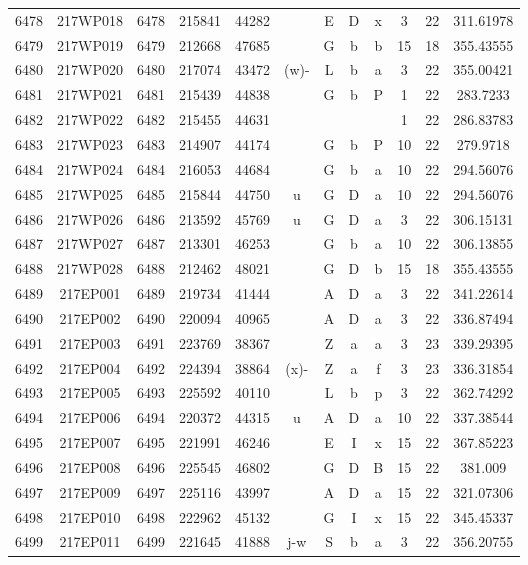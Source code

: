 \begin{tabular}{|*{12}{c|}}
6478 & 217WP018 & 6478 & 215841 & 44282 &  & E & D & x & 3 & 22 & 311.61978 \\ 
6479 & 217WP019 & 6479 & 212668 & 47685 &  & G & b & b & 15 & 18 & 355.43555 \\ 
6480 & 217WP020 & 6480 & 217074 & 43472 & (w)- & L & b & a & 3 & 22 & 355.00421 \\ 
6481 & 217WP021 & 6481 & 215439 & 44838 &  & G & b & P & 1 & 22 & 283.7233 \\ 
6482 & 217WP022 & 6482 & 215455 & 44631 &  &  &  &  & 1 & 22 & 286.83783 \\ 
6483 & 217WP023 & 6483 & 214907 & 44174 &  & G & b & P & 10 & 22 & 279.9718 \\ 
6484 & 217WP024 & 6484 & 216053 & 44684 &  & G & b & a & 10 & 22 & 294.56076 \\ 
6485 & 217WP025 & 6485 & 215844 & 44750 & u & G & D & a & 10 & 22 & 294.56076 \\ 
6486 & 217WP026 & 6486 & 213592 & 45769 & u & G & D & a & 3 & 22 & 306.15131 \\ 
6487 & 217WP027 & 6487 & 213301 & 46253 &  & G & b & a & 10 & 22 & 306.13855 \\ 
6488 & 217WP028 & 6488 & 212462 & 48021 &  & G & D & b & 15 & 18 & 355.43555 \\ 
6489 & 217EP001 & 6489 & 219734 & 41444 &  & A & D & a & 3 & 22 & 341.22614 \\ 
6490 & 217EP002 & 6490 & 220094 & 40965 &  & A & D & a & 3 & 22 & 336.87494 \\ 
6491 & 217EP003 & 6491 & 223769 & 38367 &  & Z & a & a & 3 & 23 & 339.29395 \\ 
6492 & 217EP004 & 6492 & 224394 & 38864 & (x)- & Z & a & f & 3 & 23 & 336.31854 \\ 
6493 & 217EP005 & 6493 & 225592 & 40110 &  & L & b & p & 3 & 22 & 362.74292 \\ 
6494 & 217EP006 & 6494 & 220372 & 44315 & u & A & D & a & 10 & 22 & 337.38544 \\ 
6495 & 217EP007 & 6495 & 221991 & 46246 &  & E & I & x & 15 & 22 & 367.85223 \\ 
6496 & 217EP008 & 6496 & 225545 & 46802 &  & G & D & B & 15 & 22 & 381.009 \\ 
6497 & 217EP009 & 6497 & 225116 & 43997 &  & A & D & a & 15 & 22 & 321.07306 \\ 
6498 & 217EP010 & 6498 & 222962 & 45132 &  & G & I & x & 15 & 22 & 345.45337 \\ 
6499 & 217EP011 & 6499 & 221645 & 41888 & j-w & S & b & a & 3 & 22 & 356.20755 \\ 

\end{tabular}

